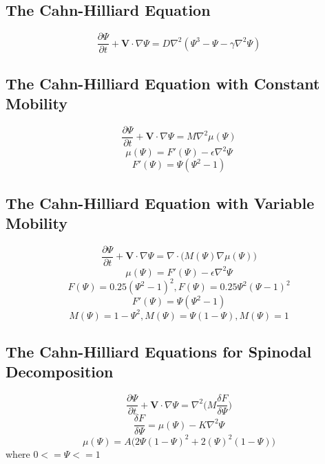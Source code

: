 \documentclass[12pt]{extarticle}
\begin{document}
\subsection*{The Cahn-Hilliard Equation}
\begin{equation}
\frac{\partial \Psi}{\partial t}  +  \textbf{V} \cdot \nabla \Psi =  D\nabla^{2}(\Psi^{3}-\Psi - \gamma \nabla^{2}\Psi)
\end{equation}

\subsection*{The Cahn-Hilliard Equation with Constant Mobility}
\begin{equation}
\frac{\partial \Psi}{\partial t}  +  \textbf{V} \cdot \nabla \Psi =  M\nabla^{2} \mu(\Psi)
\end{equation}
\begin{equation}
\mu(\Psi) = F'(\Psi) - \epsilon \nabla^{2} \Psi
\end{equation}
\begin{equation}
F'(\Psi) = \Psi(\Psi^{2}-1)
\end{equation}

\subsection*{The Cahn-Hilliard Equation with Variable Mobility}
\begin{equation}
\frac{\partial \Psi}{\partial t}  +  \textbf{V} \cdot \nabla \Psi =  \nabla \cdot \Big( M(\Psi) \nabla \mu(\Psi) \Big)
\end{equation}
\begin{equation}
\mu(\Psi) = F'(\Psi) - \epsilon \nabla^{2} \Psi
\end{equation}
\begin{equation}
F(\Psi) = 0.25(\Psi^{2}-1)^{2}, F(\Psi) = 0.25\Psi^{2}(\Psi-1)^{2}
\end{equation}
\begin{equation}
F'(\Psi) = \Psi(\Psi^{2}-1)
\end{equation}
\begin{equation}
M(\Psi) = 1 - \Psi^{2},  M(\Psi) = \Psi(1 - \Psi), M(\Psi) = 1
\end{equation}
\subsection*{The Cahn-Hilliard Equations for Spinodal Decomposition}
\begin{equation}
\frac{\partial \Psi}{\partial t}  +  \textbf{V} \cdot \nabla \Psi =  \nabla^{2} \Big(M  \frac{\delta F}{\delta \Psi} \Big)
\end{equation}
\begin{equation}
\frac{\delta F}{\delta \Psi} = \mu(\Psi) - K \nabla^{2} \Psi
\end{equation}
\begin{equation}
\mu(\Psi) = A \Big( 2 \Psi(1-\Psi)^{2}+2(\Psi)^{2}(1-\Psi)\Big)
\end{equation}
where $0 <= \Psi <= 1$
\end{document}
